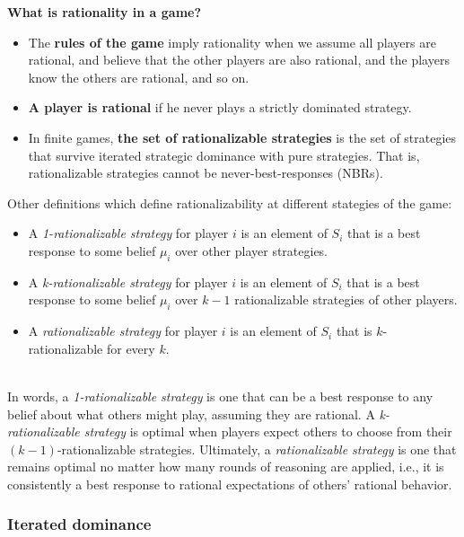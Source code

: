 \documentclass{article}
\begin{document}
\noindent \textbf{What is rationality in a game?}
\begin{itemize}
    \item The \textbf{rules of the game} imply rationality when we assume all players are rational, and believe that the other players are also rational, and the players know the others are rational, and so on. 
    \item \textbf{A player is rational} if he never plays a strictly dominated strategy.
    \item In finite games, \textbf{the set of rationalizable strategies} is the set of strategies that survive iterated strategic dominance with pure strategies. That is, rationalizable strategies cannot be never-best-responses (NBRs). 
\end{itemize} 


\noindent Other definitions which define rationalizability at different stategies of the game:
\begin{itemize}
    \item A \textit{1-rationalizable strategy} for player \( i \) is an element of \( S_i \) that is a best response to some belief \( \mu_i \) over other player strategies.
    \item A \textit{k-rationalizable strategy} for player \( i \) is an element of \( S_i \) that is a best response to some belief \( \mu_i \) over \( k-1 \) rationalizable strategies of other players.
    \item A \textit{rationalizable strategy} for player \( i \) is an element of \( S_i \) that is \( k \)-rationalizable for every \( k \).
\end{itemize} \\

In words, a \textit{1-rationalizable strategy} is one that can be a best response to any belief about what others might play, assuming they are rational. A \textit{k-rationalizable strategy} is optimal when players expect others to choose from their \( (k-1) \)-rationalizable strategies. Ultimately, a \textit{rationalizable strategy} is one that remains optimal no matter how many rounds of reasoning are applied, i.e., it is consistently a best response to rational expectations of others' rational behavior. \\ 

\subsubsection{Iterated dominance}\label{ISD}
\end{document}
